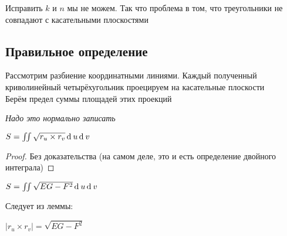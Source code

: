 Исправить $ k $ и $ n $ мы не можем. Так что проблема в том, что треугольники не совпадают с касательными плоскостями

\subsection{Правильное определение}

Рассмотрим разбиение координатными линиями. Каждый полученный криволинейный четырёхугольник проецируем на касательные плоскости \\
Берём предел суммы площадей этих проекций

\textit{Надо это нормально записать}

\begin{theorem}
	$ S = \iint\sqrt{r_u \times r_v}\operatorname{d}^{} u \operatorname{d}^{} v $
\end{theorem}

\begin{proof}
	Без доказательства (на самом деле, это и есть определение двойного интеграла)
\end{proof}

\begin{theorem}
	$ S = \iint\sqrt{EG - F^2}\operatorname{d}^{} u \operatorname{d}^{} v $
\end{theorem}

Следует из леммы:

\begin{lemma}
	$ |r_u \times r_v | = \sqrt{EG - F^2} $
\end{lemma}
